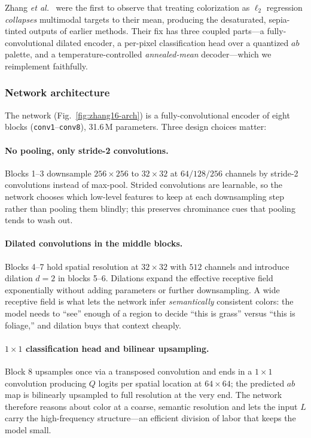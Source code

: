 Zhang \emph{et al.}~\cite{zhang2016colorful} were the first to observe that
treating colorization as $\ell_2$ regression \emph{collapses} multimodal targets
to their mean, producing the desaturated, sepia-tinted outputs of earlier
methods. Their fix has three coupled parts---a fully-convolutional dilated
encoder, a per-pixel classification head over a quantized $ab$ palette, and a
temperature-controlled \emph{annealed-mean} decoder---which we reimplement
faithfully.

\subsubsection{Network architecture}
The network (Fig.~\ref{fig:zhang16-arch}) is a fully-convolutional encoder of
eight blocks (\texttt{conv1}--\texttt{conv8}), 31.6\,M parameters. Three design
choices matter:

\paragraph{No pooling, only stride-2 convolutions.}
Blocks 1--3 downsample $256\!\times\!256$ to $32\!\times\!32$ at $64/128/256$
channels by stride-2 convolutions instead of max-pool. Strided convolutions are
learnable, so the network chooses which low-level features to keep at each
downsampling step rather than pooling them blindly; this preserves chrominance
cues that pooling tends to wash out.

\paragraph{Dilated convolutions in the middle blocks.}
Blocks 4--7 hold spatial resolution at $32\!\times\!32$ with $512$ channels and
introduce dilation $d=2$ in blocks 5--6. Dilations expand the effective
receptive field exponentially without adding parameters or further
downsampling. A wide receptive field is what lets the network infer
\emph{semantically} consistent colors: the model needs to ``see'' enough of a
region to decide ``this is grass'' versus ``this is foliage,'' and dilation buys
that context cheaply.

\paragraph{$1\!\times\!1$ classification head and bilinear upsampling.}
Block 8 upsamples once via a transposed convolution and ends in a
$1\!\times\!1$ convolution producing $Q$ logits per spatial location at
$64\!\times\!64$; the predicted $ab$ map is bilinearly upsampled to full
resolution at the very end. The network therefore reasons about color at a
coarse, semantic resolution and lets the input $L$ carry the high-frequency
structure---an efficient division of labor that keeps the model small.

